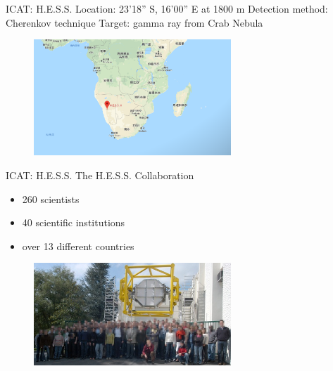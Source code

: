\documentclass{beamer}
\begin{document}
\begin{frame}{ICAT: H.E.S.S.}
	Location: 23'18'' S, 16'00'' E at 1800 m
	\newline
	Detection method: Cherenkov technique
	\newline
	Target: gamma ray from Crab Nebula
	\begin{figure}[h]
		\includegraphics[width=280px]{HESS_location.png}
	\end{figure}
\end{frame}


\begin{frame}{ICAT: H.E.S.S.}
	The H.E.S.S. Collaboration
	\begin{itemize}
		\item 260 scientists
		\item 40 scientific institutions
		\item over 13 different countries
	\end{itemize}
	\begin{figure}[h]
		\includegraphics[width=280px]{hess_collaboration.jpg}
	\end{figure}
\end{frame}
\end{document}

